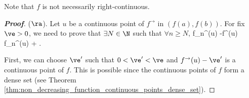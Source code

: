 \begin{remark}
Note that $f$ is not necessarily right-continuous.
\end{remark}

\begin{proof}[\bf Proof]
($\ra$). Let $u$ be a continuous point of $f^{\to}$ in $(f(a),f(b))$. For fix $\ve >0$, we need to prove that $\exists N\in \N$ such that $\forall n\geq N$,
\be
f_n^{\to}(u) -\ve \leq f^{\to}(u) \leq f_n^{\to}(u) + \ve.
\ee


First, we can choose $\ve'$ such that $0<\ve'<\ve$ and $f^{\to}(u)-\ve'$ is a continuous point of $f$. This is possible since the continuous points of $f$ form a dense set (see Theorem \ref{thm:non_decreasing_function_continuous_points_dense_set}).

%
%
%


%


\end{proof}
